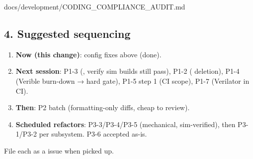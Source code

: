 \begin{relocated}{docs/development/CODING_COMPLIANCE_AUDIT.md}
{}

\subsection{4. Suggested sequencing}\label{um:guide:coding-compliance-audit:4-suggested-sequencing}

\begin{enumerate}
\def\labelenumi{\arabic{enumi}.}
\tightlist
\item
  \textbf{Now (this change)}: config fixes above (done).
\item
  \textbf{Next session}: P1-3 (, verify sim builds
  still pass), P1-2 ( deletion), P1-4 (Verible burn-down →
  hard gate), P1-5 step 1 (CI scope), P1-7 (Verilator in CI).
\item
  \textbf{Then}: P2 batch (formatting-only diffs, cheap to review).
\item
  \textbf{Scheduled refactors}: P3-3/\allowbreak{}P3-4/\allowbreak{}P3-5
  (mechanical, sim-verified), then P3-1/P3-2 per subsystem. P3-6
  accepted as-is.
\end{enumerate}

File each as a  issue when picked up.
\end{relocated}

